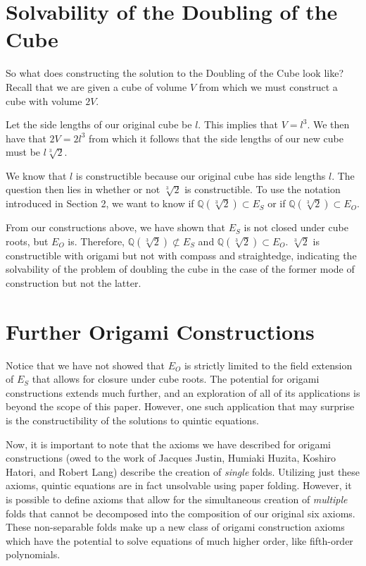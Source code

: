 \documentclass[]{article}
\begin{document}
    \section{Solvability of the Doubling of the Cube}
    So what does constructing the solution to the Doubling of the Cube look like? Recall that we are given a cube of volume $V$ from which we must construct a cube with volume $2V$.
    
    Let the side lengths of our original cube be $l$. This implies that $V=l^3$. We then have that $2V=2l^3$ from which it follows that the side lengths of our new cube must be $l\sqrt[3]{2}$.
    
    We know that $l$ is constructible because our original cube has side lengths $l$. The question then lies in whether or not $\sqrt[3]{2}$ is constructible. To use the notation introduced in Section 2, we want to know if $\mathbb{Q}(\sqrt[3]{2}) \subset E_S$ or if $\mathbb{Q}(\sqrt[3]{2}) \subset E_O$.
    
    From our constructions above, we have shown that $E_S$ is not closed under cube roots, but $E_O$ is. Therefore, $\mathbb{Q}(\sqrt[3]{2}) \not\subset E_S$ and $\mathbb{Q}(\sqrt[3]{2}) \subset E_O$. $\sqrt[3]{2}$ is constructible with origami but not with compass and straightedge, indicating the solvability of the problem of doubling the cube in the case of the former mode of construction but not the latter.
    
    \section{Further Origami Constructions}
    Notice that we have not showed that $E_O$ is strictly limited to the field extension of $E_S$ that allows for closure under cube roots. The potential for origami constructions extends much further, and an exploration of all of its applications is beyond the scope of this paper. However, one such application that may surprise is the constructibility of the solutions to quintic equations.
    
    Now, it is important to note that the axioms we have described for origami constructions (owed to the work of Jacques Justin, Humiaki Huzita, Koshiro Hatori, and Robert Lang) describe the creation of \emph{single} folds. Utilizing just these axioms, quintic equations are in fact unsolvable using paper folding. However, it is possible to define axioms that allow for the simultaneous creation of \emph{multiple} folds that cannot be decomposed into the composition of our original six axioms. These non-separable folds make up a new class of origami construction axioms which have the potential to solve equations of much higher order, like fifth-order polynomials.
    
\end{document}
